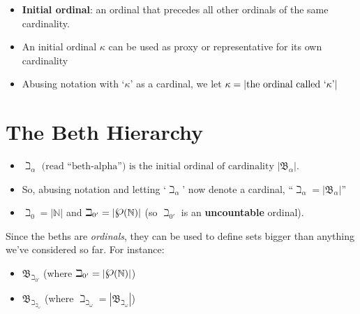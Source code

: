 \documentclass[12pt]{extarticle}
\begin{document}
\begin{itemize}

\item \textbf{Initial ordinal}: an ordinal that precedes all other ordinals of the same cardinality.

\item An initial ordinal $\kappa$ can be used as proxy or representative for its own cardinality

\item Abusing notation with `$\kappa$' as a cardinal, we let $\kappa = |\text{the ordinal called }`\kappa\text{'}|$

\end{itemize}


\section{The Beth Hierarchy}


\begin{itemize}

\item $\beth_\alpha \text{ (read ``beth-alpha'') is the initial ordinal of cardinality } |\mathfrak{B}_\alpha|$.

\item So, abusing notation and letting `$\beth_\alpha$' now denote a cardinal, ``$\beth_\alpha = |\mathfrak{B}_\alpha|$''


\item $\beth_0 = |\mathbb{N}|$ and $\beth_{0'} = |\powerset(\mathbb{N})|$ (so $\beth_{0'}$ is an \textbf{uncountable} ordinal). 


\end{itemize}
\vspace{2mm}
\noindent
Since the beths are \emph{ordinals}, they can be used to define sets bigger than anything we've considered so far. For instance: 

\begin{itemize}

\item $\mathfrak{B}_{\beth_{0'}}$ (where $\beth_{0'} = |\powerset(\mathbb{N})|$)

\item $\mathfrak{B}_{\beth_{\beth_\omega}}$ (where $\beth_{\beth_\omega} = |\mathfrak{B}_{\beth_{\omega}}|$)


\end{itemize}
\end{document}
